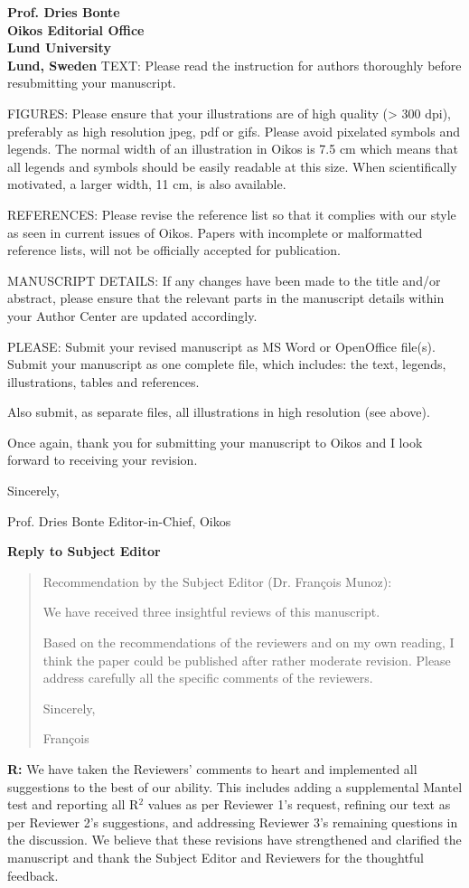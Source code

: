 \documentclass[12pt]{letter}
\begin{document}
\begin{letter}{\bf Prof. Dries Bonte\\
Oikos Editorial Office \\
Lund University \\
Lund, Sweden}
TEXT: Please read the instruction for authors thoroughly before resubmitting your manuscript.

FIGURES: Please ensure that your illustrations are of high quality (> 300 dpi), preferably as high resolution jpeg, pdf or gifs. Please avoid pixelated symbols and legends. The normal width of an illustration in Oikos is 7.5 cm which means that all legends and symbols should be easily readable at this size. When scientifically motivated, a larger width, 11 cm, is also available.

REFERENCES: Please revise the reference list so that it complies with our style as seen in current issues of Oikos. Papers with incomplete or malformatted reference lists, will not be officially accepted for publication.

MANUSCRIPT DETAILS: If any changes have been made to the title and/or abstract, please ensure that the relevant parts in the manuscript details within your Author Center are updated accordingly.

PLEASE: Submit your revised manuscript as MS Word or OpenOffice file(s). Submit your manuscript as one complete file, which includes: the text, legends, illustrations, tables and references.

Also submit, as separate files, all illustrations in high resolution (see above).

Once again, thank you for submitting your manuscript to Oikos and I look forward to receiving your revision.

Sincerely,

Prof. Dries Bonte
Editor-in-Chief, Oikos


\clearpage

{\large \textbf{Reply to Subject Editor}}

  \begin{quotation}
    Recommendation by the Subject Editor (Dr. Fran\c{c}ois Munoz):

    We have received three insightful reviews of this manuscript.

    Based on the recommendations of the reviewers and on my own reading, I think the paper could be published after rather moderate revision. Please address carefully all the specific comments of the reviewers.

    Sincerely,

    Fran\c{c}ois
  \end{quotation}

  
  \textbf{R:} We have taken the Reviewers' comments to heart and implemented all suggestions to the best of our ability. This includes adding a supplemental Mantel test and reporting all R$^2$ values as per Reviewer 1's request, refining our text as per Reviewer 2's suggestions, and addressing Reviewer 3's remaining questions in the discussion. We believe that these revisions have strengthened and clarified the manuscript and thank the Subject Editor and Reviewers for the thoughtful feedback.



\end{letter}
\end{document}
